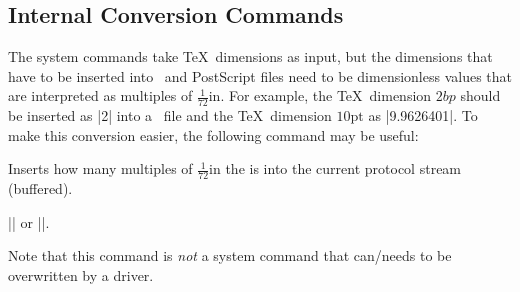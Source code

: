 \subsection{Internal Conversion Commands}

The system commands take \TeX\ dimensions as input, but the dimensions
that have to be inserted into \pdf\ and PostScript files need to be
dimensionless values that are interpreted as multiples of
$\frac{1}{72}\mathrm{in}$. For example, the \TeX\ dimension $2bp$
should be inserted as |2| into a \pdf\ file and the \TeX\ dimension
$10\mathrm{pt}$ as |9.9626401|. To make this conversion easier, the following
command may be useful:

\begin{command}{\pgf@sys@bp{}}
  Inserts how many multiples of $\frac{1}{72}\mathrm{in}$ the
   is into the current protocol stream (buffered).

  \example |\pgf@sys@bp{\pgf@x}| or |\pgf@sys@bp{1cm}|.
\end{command}

Note that this command is \emph{not} a system command that can/needs
to be overwritten by a driver.

